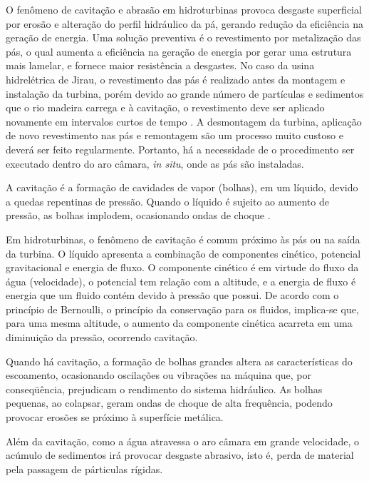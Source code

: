 O fenômeno de cavitação e abrasão em hidroturbinas provoca desgaste
superficial por erosão e alteração do perfil
hidráulico da pá, gerando redução da eficiência na geração de energia.
Uma solução preventiva é o revestimento por metalização das pás, o qual aumenta a eficiência na
geração de energia por gerar uma estrutura mais lamelar, e fornece maior
resistência a desgastes. No caso da usina hidrelétrica de Jirau, o revestimento
das pás é realizado antes da montagem e instalação da turbina, porém devido ao grande número de
partículas e sedimentos que o rio madeira carrega e à cavitação, o revestimento
deve ser aplicado novamente em intervalos curtos de tempo
\citep{santa2009slurry}. A desmontagem da turbina, aplicação de novo
revestimento nas pás e remontagem são um processo muito custoso e deverá ser
feito regularmente. Portanto, há a necessidade de o procedimento ser
executado dentro do aro câmara, \textit{in situ}, onde as pás são instaladas.

A cavitação é a formação de cavidades de vapor (bolhas), em um líquido, devido a
quedas repentinas de pressão. Quando o líquido é sujeito ao aumento de pressão,
as bolhas implodem, ocasionando ondas de choque \citep{brennen2013cavitation}.

Em hidroturbinas, o fenômeno de cavitação é comum próximo às pás ou
na saída da turbina. O líquido apresenta a combinação
de componentes cinético, potencial gravitacional e energia de fluxo. O
componente cinético é em virtude do fluxo da água (velocidade), o potencial tem
relação com a altitude, e a energia de fluxo é energia que um fluido contém
devido à pressão que possui. De acordo com o princípio de Bernoulli, o princípio
da conservação para os fluidos, implica-se que, para uma mesma altitude, o
aumento da componente cinética acarreta em uma diminuição da pressão, ocorrendo
cavitação. 

Quando há cavitação, a formação de bolhas grandes altera as características do
escoamento, ocasionando oscilações ou vibrações na máquina que, por
conseqüência, prejudicam o rendimento do sistema hidráulico. As bolhas
pequenas, ao colapsar, geram ondas de choque de alta frequência, podendo provocar erosões se
próximo à superfície metálica.

Além da cavitação, como a água atravessa o aro câmara em grande velocidade, o
acúmulo de sedimentos irá provocar desgaste abrasivo, isto é, perda de material
pela passagem de párticulas rígidas. 

